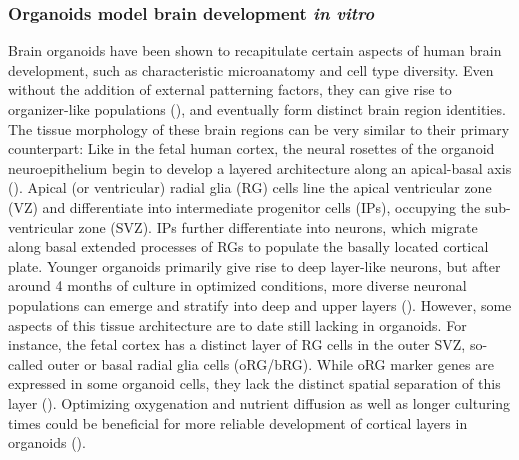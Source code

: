 \subsubsection{Organoids model brain development \textit{in vitro}}

Brain organoids have been shown to recapitulate certain aspects of human brain development, such as characteristic microanatomy and cell type diversity. Even without the addition of external patterning factors, they can give rise to organizer-like populations (\cite{renner_self-organized_2017}), and eventually form distinct brain region identities. The tissue morphology of these brain regions can be very similar to their primary counterpart: Like in the fetal human cortex, the neural rosettes of the organoid neuroepithelium begin to develop a layered architecture along an apical-basal axis (\cite{kadoshima_self-organization_2013,lancaster_cerebral_2013}). Apical (or ventricular) radial glia (RG) cells line the apical ventricular zone (VZ) and differentiate into intermediate progenitor cells (IPs), occupying the sub-ventricular zone (SVZ). IPs further differentiate into neurons, which migrate along basal extended processes of RGs to populate the basally located cortical plate. Younger organoids primarily give rise to deep layer-like neurons, but after around 4 months of culture in optimized conditions, more diverse neuronal populations can emerge and stratify into deep and upper layers (\cite{kanton_organoid_2019,qian_sliced_2020}). However, some aspects of this tissue architecture are to date still lacking in organoids. For instance, the fetal cortex has a distinct layer of RG cells in the outer SVZ, so-called outer or basal radial glia cells (oRG/bRG). While oRG marker genes are expressed in some organoid cells, they lack the distinct spatial separation of this layer (\cite{bhaduri_cell_2020}). Optimizing oxygenation and nutrient diffusion as well as longer culturing times could be beneficial for more reliable development of cortical layers in organoids (\cite{bhaduri_cell_2020,chiaradia_brain_2020}).

